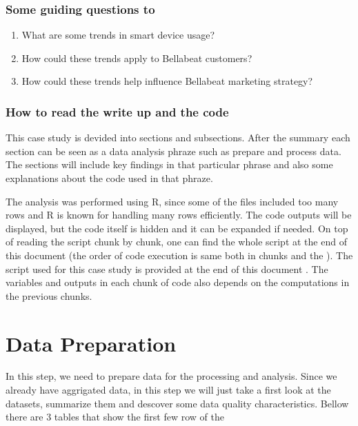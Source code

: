 \documentclass[
]{article}
\providecommand{\tightlist}{%
  \setlength{\itemsep}{0pt}\setlength{\parskip}{0pt}}
\begin{document}
\hypertarget{some-guiding-questions-to}{%
\subsubsection{Some guiding questions
to}\label{some-guiding-questions-to}}

\begin{enumerate}
\def\labelenumi{\arabic{enumi}.}
\tightlist
\item
  What are some trends in smart device usage?
\item
  How could these trends apply to Bellabeat customers?
\item
  How could these trends help influence Bellabeat marketing strategy?
\end{enumerate}

\hypertarget{how-to-read-the-write-up-and-the-code}{%
\subsubsection{How to read the write up and the
code}\label{how-to-read-the-write-up-and-the-code}}

This case study is devided into sections and subsections. After the
summary each section can be seen as a data analysis phraze such as
prepare and process data. The sections will include key findings in that
particular phrase and also some explanations about the code used in that
phraze.

The analysis was performed using R, since some of the files included too
many rows and R is known for handling many rows efficiently. The code
outputs will be displayed, but the code itself is hidden and it can be
expanded if needed. On top of reading the script chunk by chunk, one can
find the whole script at the end of this document (the order of code
execution is same both in chunks and the ). The script used for this
case study is provided at the end of this document . The variables and
outputs in each chunk of code also depends on the computations in the
previous chunks.

\hypertarget{data-preparation}{%
\section{Data Preparation}\label{data-preparation}}

In this step, we need to prepare data for the processing and analysis.
Since we already have aggrigated data, in this step we will just take a
first look at the datasets, summarize them and descover some data
quality characteristics. Bellow there are 3 tables that show the first
few row of the
\end{document}
